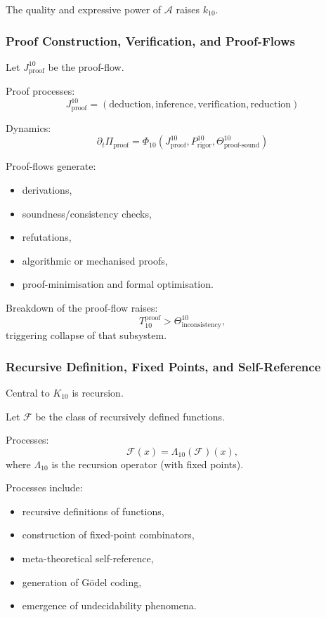 The quality and expressive power of $\mathcal{A}$ raises $k_{10}$.

\subsubsection{Proof Construction, Verification, and Proof-Flows}

Let $J^{10}_{\text{proof}}$ be the proof-flow.

Proof processes:
\[
J^{10}_{\text{proof}} =
(\text{deduction}, \text{inference}, \text{verification}, \text{reduction})
\]

Dynamics:
\[
\partial_t \Pi_{\text{proof}}
= \Phi_{10}(J^{10}_{\text{proof}},
            P^{10}_{\text{rigor}},
            \Theta^{10}_{\text{proof-sound}})
\]

Proof-flows generate:
\begin{itemize}
    \item derivations,
    \item soundness/consistency checks,
    \item refutations,
    \item algorithmic or mechanised proofs,
    \item proof-minimisation and formal optimisation.
\end{itemize}

Breakdown of the proof-flow raises:
\[
T_{10}^{\text{proof}} > \Theta^{10}_{\text{inconsistency}},
\]
triggering collapse of that subsystem.

\subsubsection{Recursive Definition, Fixed Points, and Self-Reference}

Central to $K_{10}$ is recursion.

Let $\mathcal{F}$ be the class of recursively defined functions.

Processes:
\[
\mathcal{F}(x) = \Lambda_{10}(\mathcal{F})(x),
\]
where $\Lambda_{10}$ is the recursion operator (with fixed points).

Processes include:
\begin{itemize}
    \item recursive definitions of functions,
    \item construction of fixed-point combinators,
    \item meta-theoretical self-reference,
    \item generation of Gödel coding,
    \item emergence of undecidability phenomena.
\end{itemize}

